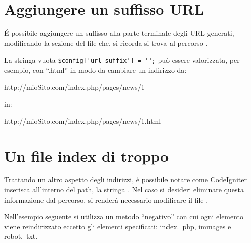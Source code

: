 \section{Aggiungere un suffisso URL}
\'E possibile aggiungere un suffisso alla parte terminale degli \ac{URL} generati, modificando la sezione  del file  che, si ricorda si trova al percorso  . 

La stringa vuota \verb|$config['url_suffix'] = '';| può essere valorizzata, per esempio, con ``.html'' in modo da cambiare un indirizzo da: 

\begin{code}
http://mioSito.com/index.php/pages/news/1
\end{code}

in:

\begin{code}
http://mioSito.com/index.php/pages/news/1.html
\end{code}

\label{sec:index}
\section{Un file index di troppo}
Trattando un altro aspetto degli indirizzi, è possibile notare come CodeIgniter inserisca all'interno del path, la stringa . Nel caso si desideri eliminare questa informazione dal percorso, si renderà necessario modificare il file . 

Nell'esempio seguente si utilizza un metodo ``negativo'' con cui ogni elemento viene reindirizzato eccetto gli elementi specificati: index.~php, immages e robot.~txt.

